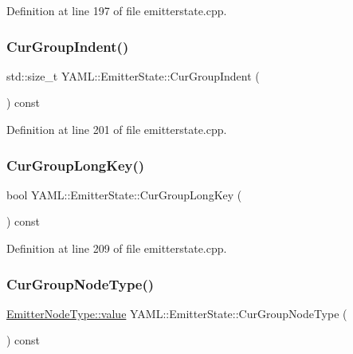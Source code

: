 Definition at line 197 of file emitterstate.\+cpp.

\mbox{\label{class_y_a_m_l_1_1_emitter_state_aebf589d8af74a64d8193dd883ae8c079}} 
\subsubsection{\texorpdfstring{CurGroupIndent()}{CurGroupIndent()}}
{\footnotesize\ttfamily std\+::size\+\_\+t Y\+A\+M\+L\+::\+Emitter\+State\+::\+Cur\+Group\+Indent (\begin{DoxyParamCaption}{ }\end{DoxyParamCaption}) const}



Definition at line 201 of file emitterstate.\+cpp.

\mbox{\label{class_y_a_m_l_1_1_emitter_state_a9c96c726681159b1866a389a3d8c4fc1}} 
\subsubsection{\texorpdfstring{CurGroupLongKey()}{CurGroupLongKey()}}
{\footnotesize\ttfamily bool Y\+A\+M\+L\+::\+Emitter\+State\+::\+Cur\+Group\+Long\+Key (\begin{DoxyParamCaption}{ }\end{DoxyParamCaption}) const}



Definition at line 209 of file emitterstate.\+cpp.

\mbox{\label{class_y_a_m_l_1_1_emitter_state_a0b8065447d34c280371e50c7a1b3d3d3}} 
\subsubsection{\texorpdfstring{CurGroupNodeType()}{CurGroupNodeType()}}
{\footnotesize\ttfamily \mbox{\hyperlink{struct_y_a_m_l_1_1_emitter_node_type_ac42d64defd19943e78fd749faade2103}{Emitter\+Node\+Type\+::value}} Y\+A\+M\+L\+::\+Emitter\+State\+::\+Cur\+Group\+Node\+Type (\begin{DoxyParamCaption}{ }\end{DoxyParamCaption}) const}



